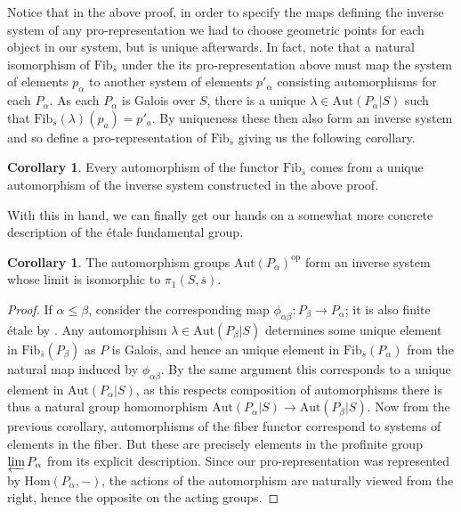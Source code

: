 \documentclass{article}
\theoremstyle{definition}
\newtheorem{corollary}[theorem]{Corollary}
\theoremstyle{remark}
\begin{document}
Notice that in the above proof, in order to specify the maps defining the inverse system of any pro-representation we had to choose geometric points for each object in our system, but is unique afterwards.
In fact, note that a natural isomorphism of $\text{Fib}_{\overline{s}}$ under the its pro-representation above must map the system of elements $p_{\alpha}$ to another system of elements $p'_{\alpha}$ consisting automorphisms for each $P_{\alpha}$.
As each $P_{\alpha}$ is Galois over $S$, there is a unique $ \lambda \in \text{Aut}(P_{\alpha}|S)$ such that $\text{Fib}_{\overline{s}}(\lambda)(p_a) = p'_a$.
By uniqueness these then also form an inverse system and so define a pro-representation of $\text{Fib}_{\overline{s}}$ giving us the following corollary.

\begin{corollary}
	Every automorphism of the functor $\text{Fib}_{\overline{s}}$ comes from a unique automorphism of the inverse system constructed in the above proof.
\end{corollary}

With this in hand, we can finally get our hands on a somewhat more concrete description of the \'etale fundamental group.

\begin{corollary}
	The automorphism groups $\text{Aut}(P_{\alpha})^{\text{op}}$ form an inverse system whose limit is isomorphic to $\pi_1(S, \overline{s})$.
\end{corollary}

\begin{proof}
	
	If $\alpha \leq \beta$, consider the corresponding map $\phi_{\alpha \beta}: P_{\beta} \to P_{\alpha}$; it is also finite \'etale by .
	Any automorphism $\lambda \in \text{Aut}(P_{\beta}|S)$ determines some unique element in $\text{Fib}_{\overline{s}}(P_{\beta})$ as $P$ is Galois, and hence an unique element in $\text{Fib}_{\overline{s}}(P_{\alpha})$ from the natural map induced by $\phi_{\alpha \beta}$.
By the same argument this corresponds to a unique element in $\text{Aut}(P_{\alpha}|S)$, as this respects composition of automorphisms there is thus a natural group homomorphism $\text{Aut}(P_{\alpha}|S) \to \text{Aut}(P_{\beta}|S)$.
Now from the previous corollary, automorphisms of the fiber functor correspond to systems of elements in the fiber.
But these are precisely elements in the profinite group $\varprojlim P_{\alpha}$ from its explicit description.
Since our pro-representation was represented by $\text{Hom}(P_{\alpha}, -)$, the actions of the automorphism are naturally viewed from the right, hence the opposite on the acting groups.
\end{proof}
\end{document}
